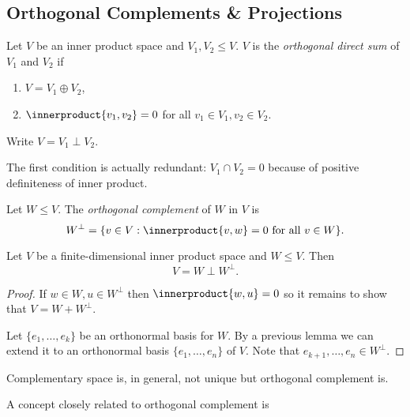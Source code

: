 \documentclass[a4paper]{article}
\newcommand*{\ip}{\innerproduct}
\theoremstyle{definition}
\begin{document}
\subsection{Orthogonal Complements \& Projections}

\begin{definition}
  Let \(V\) be an inner product space and \(V_1, V_2 \leq V\). \(V\) is the \emph{orthogonal direct sum} of \(V_1\) and \(V_2\) if
  \begin{enumerate}
  \item \(V = V_1 \oplus V_2\),
  \item \(\ip{v_1, v_2} = 0\) for all \(v_1 \in V_1, v_2 \in V_2\).
  \end{enumerate}
  Write \(V = V_1 \perp V_2\).
\end{definition}

\begin{note}
  The first condition is actually redundant: \(V_1 \cap V_2 = 0\) because of positive definiteness of inner product.
\end{note}

\begin{definition}
  Let \(W \leq V\). The \emph{orthogonal complement} of \(W\) in \(V\) is
  \[
    W^\perp = \{v \in V: \ip{v, w} = 0 \text{ for all } v \in W \}.
  \]
\end{definition}

\begin{lemma}
  Let \(V\) be a finite-dimensional inner product space and \(W \leq V\). Then
  \[
    V =  W \perp W^\perp.
  \]
\end{lemma}

\begin{proof}
  If \(w \in W, u \in W^\perp\) then \(\ip{w, u} = 0\) so it remains to show that \(V = W + W^\perp\).

  Let \(\{e_1, \dots, e_k\}\) be an orthonormal basis for \(W\). By a previous lemma we can extend it to an orthonormal basis \(\{e_1, \dots, e_n\}\) of \(V\). Note that \(e_{k + 1}, \dots, e_n \in W^\perp\).
\end{proof}

\begin{note}
  Complementary space is, in general, not unique but orthogonal complement is.
\end{note}

A concept closely related to orthogonal complement is
\end{document}
